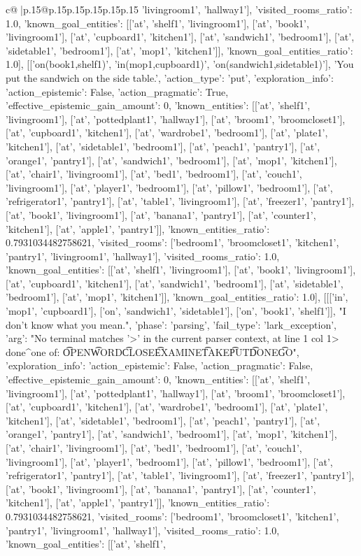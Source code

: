 \documentclass{article}
\begin{document}
{\begin{supertabular}{c@{$\;$}|p{.15\linewidth}@{}p{.15\linewidth}p{.15\linewidth}p{.15\linewidth}p{.15\linewidth}p{.15\linewidth}}
{{{'livingroom1', 'hallway1'], 'visited_rooms_ratio': 1.0, 'known_goal_entities': [['at', 'shelf1', 'livingroom1'], ['at', 'book1', 'livingroom1'], ['at', 'cupboard1', 'kitchen1'], ['at', 'sandwich1', 'bedroom1'], ['at', 'sidetable1', 'bedroom1'], ['at', 'mop1', 'kitchen1']], 'known_goal_entities_ratio': 1.0}}], [['on(book1,shelf1)', 'in(mop1,cupboard1)', 'on(sandwich1,sidetable1)'], 'You put the sandwich on the side table.', {'action_type': 'put', 'exploration_info': {'action_epistemic': False, 'action_pragmatic': True, 'effective_epistemic_gain_amount': 0, 'known_entities': [['at', 'shelf1', 'livingroom1'], ['at', 'pottedplant1', 'hallway1'], ['at', 'broom1', 'broomcloset1'], ['at', 'cupboard1', 'kitchen1'], ['at', 'wardrobe1', 'bedroom1'], ['at', 'plate1', 'kitchen1'], ['at', 'sidetable1', 'bedroom1'], ['at', 'peach1', 'pantry1'], ['at', 'orange1', 'pantry1'], ['at', 'sandwich1', 'bedroom1'], ['at', 'mop1', 'kitchen1'], ['at', 'chair1', 'livingroom1'], ['at', 'bed1', 'bedroom1'], ['at', 'couch1', 'livingroom1'], ['at', 'player1', 'bedroom1'], ['at', 'pillow1', 'bedroom1'], ['at', 'refrigerator1', 'pantry1'], ['at', 'table1', 'livingroom1'], ['at', 'freezer1', 'pantry1'], ['at', 'book1', 'livingroom1'], ['at', 'banana1', 'pantry1'], ['at', 'counter1', 'kitchen1'], ['at', 'apple1', 'pantry1']], 'known_entities_ratio': 0.7931034482758621, 'visited_rooms': ['bedroom1', 'broomcloset1', 'kitchen1', 'pantry1', 'livingroom1', 'hallway1'], 'visited_rooms_ratio': 1.0, 'known_goal_entities': [['at', 'shelf1', 'livingroom1'], ['at', 'book1', 'livingroom1'], ['at', 'cupboard1', 'kitchen1'], ['at', 'sandwich1', 'bedroom1'], ['at', 'sidetable1', 'bedroom1'], ['at', 'mop1', 'kitchen1']], 'known_goal_entities_ratio': 1.0}}], [[['in', 'mop1', 'cupboard1'], ['on', 'sandwich1', 'sidetable1'], ['on', 'book1', 'shelf1']], "I don't know what you mean.", {'phase': 'parsing', 'fail_type': 'lark_exception', 'arg': "No terminal matches '>' in the current parser context, at line 1 col 1\n\n> done\n^\nExpected one of: \n\t* OPEN\n\t* WORD\n\t* CLOSE\n\t* EXAMINE\n\t* TAKE\n\t* PUT\n\t* DONE\n\t* GO\n", 'exploration_info': {'action_epistemic': False, 'action_pragmatic': False, 'effective_epistemic_gain_amount': 0, 'known_entities': [['at', 'shelf1', 'livingroom1'], ['at', 'pottedplant1', 'hallway1'], ['at', 'broom1', 'broomcloset1'], ['at', 'cupboard1', 'kitchen1'], ['at', 'wardrobe1', 'bedroom1'], ['at', 'plate1', 'kitchen1'], ['at', 'sidetable1', 'bedroom1'], ['at', 'peach1', 'pantry1'], ['at', 'orange1', 'pantry1'], ['at', 'sandwich1', 'bedroom1'], ['at', 'mop1', 'kitchen1'], ['at', 'chair1', 'livingroom1'], ['at', 'bed1', 'bedroom1'], ['at', 'couch1', 'livingroom1'], ['at', 'player1', 'bedroom1'], ['at', 'pillow1', 'bedroom1'], ['at', 'refrigerator1', 'pantry1'], ['at', 'table1', 'livingroom1'], ['at', 'freezer1', 'pantry1'], ['at', 'book1', 'livingroom1'], ['at', 'banana1', 'pantry1'], ['at', 'counter1', 'kitchen1'], ['at', 'apple1', 'pantry1']], 'known_entities_ratio': 0.7931034482758621, 'visited_rooms': ['bedroom1', 'broomcloset1', 'kitchen1', 'pantry1', 'livingroom1', 'hallway1'], 'visited_rooms_ratio': 1.0, 'known_goal_entities': [['at', 'shelf1', }}}
\end{supertabular}}
\end{document}

